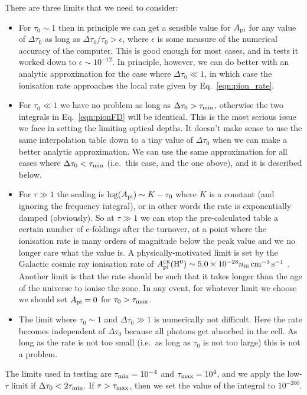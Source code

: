 \documentclass[a4paper,11pt]{article}
\begin{document}
There are three limits that we need to consider:
\begin{itemize}
\item
  For $\tau_0\sim1$ then in principle we can get a sensible value for $A_{\mathrm{pi}}$ for any value of $\Delta\tau_0$ as long as $\Delta\tau_0/\tau_0>\epsilon$, where $\epsilon$ is some measure of the numerical accuracy of the computer.
  This is good enough for most cases, and in tests it worked down to $\epsilon\sim10^{-12}$.
  In principle, however, we can do better with an analytic approximation for the case where $\Delta\tau_0\ll1$, in which case the ionisation rate approaches the local rate given by Eq.~\ref{eqn:pion_rate}.
%
\item
  For $\tau_0\ll1$ we have no problem as long as $\Delta\tau_0>\tau_{\mathrm{min}}$, otherwise the two integrals in Eq.~\ref{eqn:pionFD} will be identical.
  This is the most serious issue we face in setting the limiting optical depths.
  It doesn't make sense to use the same interpolation table down to a tiny value of $\Delta\tau_0$ when we can make a better analytic approximation.
  We can use the same approximation for all cases where $\Delta\tau_0<\tau_{\mathrm{min}}$ (i.e.\ this case, and the one above), and it is described below.
%
\item
  For $\tau\gg1$ the scaling is $\log(A_{\mathrm{pi}})\sim K - \tau_0$ where $K$ is a constant (and ignoring the frequency integral), or in other words the rate is exponentially damped (obviously).
  So at $\tau\gg1$ we can stop the pre-calculated table a certain number of e-foldings after the turnover, at a point where the ionisation rate is many orders of magnitude below the peak value and we no longer care what the value is.
  A physically-motivated limit is set by the Galactic cosmic ray ionisation rate of $A_{\mathrm{pi}}^{\textsc{cr}}(\mathrm{H}^0)\sim 5.0\times10^{-28}n_{\textsc{hi}} \,\mathrm{cm}^{-3}\,\mathrm{s}^{-1}$ \citep[e.g.][]{HenArtDeCEA09}.
  Another limit is that the rate should be such that it takes longer than the age of the universe to ionise the zone.
  In any event, for whatever limit we choose we should set $A_{\mathrm{pi}}=0$ for $\tau_0>\tau_{\mathrm{max}}$.
%
\item
  The limit where $\tau_0\sim1$ and $\Delta\tau_0\gg1$ is numerically not difficult.
  Here the rate becomes independent of $\Delta\tau_0$ because all photons get absorbed in the cell.
  As long as the rate is not too small (i.e.~as long as $\tau_0$ is not too large) this is not a problem.
%
\end{itemize}
The limits used in testing are $\tau_{\mathrm{min}}=10^{-4}$ and $\tau_{\mathrm{max}}=10^4$, and we apply the low-$\tau$ limit if $\Delta\tau_0 <2\tau_{\mathrm{min}}$.
If $\tau>\tau_{\mathrm{max}}$, then we set the value of the integral to $10^{-200}$.
\end{document}
